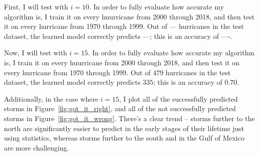 \par
First, I will test with $i=10$.
In order to fully evaluate how accurate my algorithm is, I train it on every huurricane from 2000 through 2018, and then test it on every hurricane from 1970 through 1999.
Out of --- hurricanes in the test dataset, the learned model correctly predicts ---; this is an accuracy of ----.

\par
Now, I will test with $i=15$.
In order to fully evaluate how accurate my algorithm is, I train it on every huurricane from 2000 through 2018, and then test it on every hurricane from 1970 through 1999.
Out of $479$ hurricanes in the test dataset, the learned model correctly predicts $335$; this is an accuracy of $0.70$.

\par
Additionally, in the case where $i=15$, I plot all of the successfully predicted storms in Figure~\ref{fig:got_it_right}, and all of the not successfully predicted storms in Figure~\ref{fig:got_it_wrong}.
There's a clear trend -- storms further to the north are significantly easier to predict in the early stages of their lifetime just using statistics, whereas storms further to the south and in the Gulf of Mexico are more challenging.